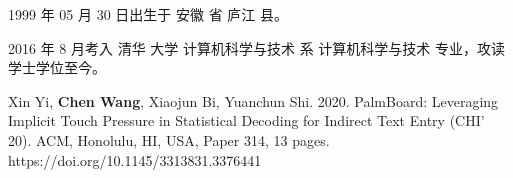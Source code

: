 
\begin{resume}


  1999 年 05 月 30 日出生于 安徽 省 庐江 县。

  2016 年 8 月考入 清华 大学 计算机科学与技术 系 计算机科学与技术 专业，攻读学士学位至今。



  \begin{publications}
    \item Xin Yi, \textbf{Chen Wang}, Xiaojun Bi, Yuanchun Shi. 2020. PalmBoard: Leveraging Implicit Touch Pressure in Statistical Decoding for Indirect Text Entry (CHI' 20). ACM, Honolulu, HI, USA, Paper 314, 13 pages. https://doi.org/10.1145/3313831.3376441
  \end{publications}




\end{resume}
